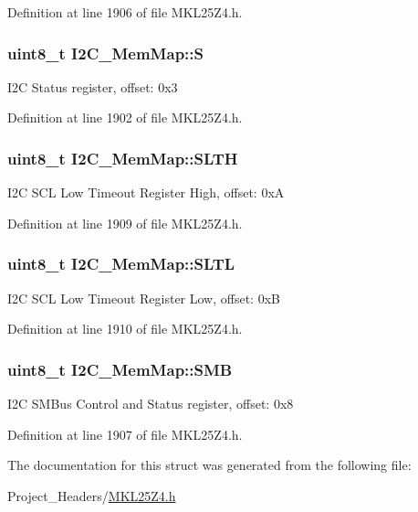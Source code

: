 Definition at line 1906 of file M\+K\+L25\+Z4.\+h.

\subsubsection[{\texorpdfstring{S}{S}}]{\setlength{\rightskip}{0pt plus 5cm}uint8\+\_\+t I2\+C\+\_\+\+Mem\+Map\+::S}\hypertarget{struct_i2_c___mem_map_acba6223219d3887b1ba085cf199bf84a}{}\label{struct_i2_c___mem_map_acba6223219d3887b1ba085cf199bf84a}
I2C Status register, offset\+: 0x3 

Definition at line 1902 of file M\+K\+L25\+Z4.\+h.

\subsubsection[{\texorpdfstring{S\+L\+TH}{SLTH}}]{\setlength{\rightskip}{0pt plus 5cm}uint8\+\_\+t I2\+C\+\_\+\+Mem\+Map\+::\+S\+L\+TH}\hypertarget{struct_i2_c___mem_map_aac56d4be80ad622d7bf85bdd8c29504c}{}\label{struct_i2_c___mem_map_aac56d4be80ad622d7bf85bdd8c29504c}
I2C S\+CL Low Timeout Register High, offset\+: 0xA 

Definition at line 1909 of file M\+K\+L25\+Z4.\+h.

\subsubsection[{\texorpdfstring{S\+L\+TL}{SLTL}}]{\setlength{\rightskip}{0pt plus 5cm}uint8\+\_\+t I2\+C\+\_\+\+Mem\+Map\+::\+S\+L\+TL}\hypertarget{struct_i2_c___mem_map_afd5aa3cef3245893addeb55556e1ceff}{}\label{struct_i2_c___mem_map_afd5aa3cef3245893addeb55556e1ceff}
I2C S\+CL Low Timeout Register Low, offset\+: 0xB 

Definition at line 1910 of file M\+K\+L25\+Z4.\+h.

\subsubsection[{\texorpdfstring{S\+MB}{SMB}}]{\setlength{\rightskip}{0pt plus 5cm}uint8\+\_\+t I2\+C\+\_\+\+Mem\+Map\+::\+S\+MB}\hypertarget{struct_i2_c___mem_map_a14ca29af4960a6588080acb71f62d5fa}{}\label{struct_i2_c___mem_map_a14ca29af4960a6588080acb71f62d5fa}
I2C S\+M\+Bus Control and Status register, offset\+: 0x8 

Definition at line 1907 of file M\+K\+L25\+Z4.\+h.



The documentation for this struct was generated from the following file\+:\begin{DoxyCompactItemize}
\item 
Project\+\_\+\+Headers/\hyperlink{_m_k_l25_z4_8h}{M\+K\+L25\+Z4.\+h}\end{DoxyCompactItemize}
